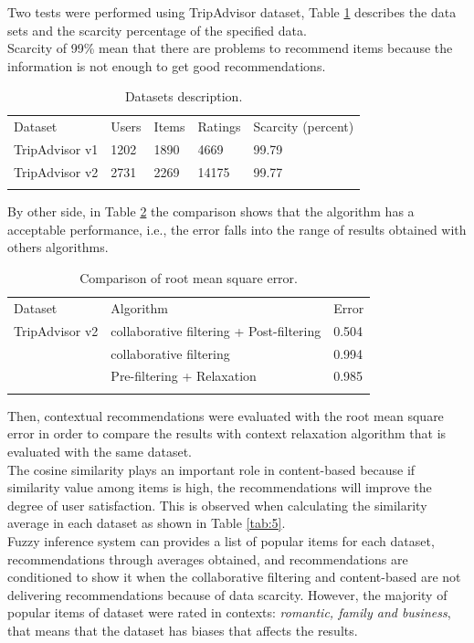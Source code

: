 Two tests were performed using TripAdvisor dataset, 
Table  \ref{tab:3} describes the data sets and the scarcity percentage of the
specified data. \\ Scarcity of 99\% mean that there are problems to
recommend items because the information is not enough to get 
good recommendations.
\begin{table}
\centering
\small
\captionsetup{font=footnotesize}
\caption{Datasets description.}
\label{tab:3}      
\begin{tabular}{lllll}
\hline\noalign{\smallskip}
Dataset & Users & Items & Ratings & Scarcity (percent) \\
\noalign{\smallskip}\hline\noalign{\smallskip}
TripAdvisor v1 & 1202 & 1890 & 4669 & 99.79 \\
TripAdvisor v2 & 2731 & 2269 & 14175 & 99.77 \\
\noalign{\smallskip}\hline
\end{tabular}
\end{table}
By other side, in Table  \ref{tab:4} the comparison
shows that the algorithm has a acceptable performance, i.e., the error
falls into the range of results obtained with others algorithms. 
\begin{table}
\centering
\small
\captionsetup{font=footnotesize}
\caption{Comparison of root mean square error.}
\label{tab:4}  
\small   
\begin{tabular}{lll}
\hline\noalign{\smallskip}
Dataset & Algorithm & Error \\
\noalign{\smallskip}\hline\noalign{\smallskip}
TripAdvisor v2 & collaborative filtering + Post-filtering  & 0.504  \\
                        & collaborative filtering                           & 0.994  \\
                        & Pre-filtering + Relaxation                     & 0.985  \\
\noalign{\smallskip}\hline
\end{tabular}
\end{table}
Then, contextual recommendations were evaluated with the 
root mean square error in order to compare the results with context 
relaxation algorithm  \cite{zheng2012differential} that is evaluated 
with the same dataset.\\ 
The cosine similarity plays an important role in content-based because
if similarity value among items is high, the recommendations will
improve the degree of user satisfaction. This is observed when
calculating the similarity average in each dataset as shown in 
Table  \ref{tab:5}.\\ 
Fuzzy inference system can provides a list of popular items for each dataset,
recommendations through averages obtained, and recommendations are
conditioned to show it when the collaborative filtering and content-based 
are not delivering recommendations because of data scarcity.
However, the majority of popular items of dataset were rated in contexts: 
\textit{romantic, family and business}, that means that the dataset has
biases that affects the results.

